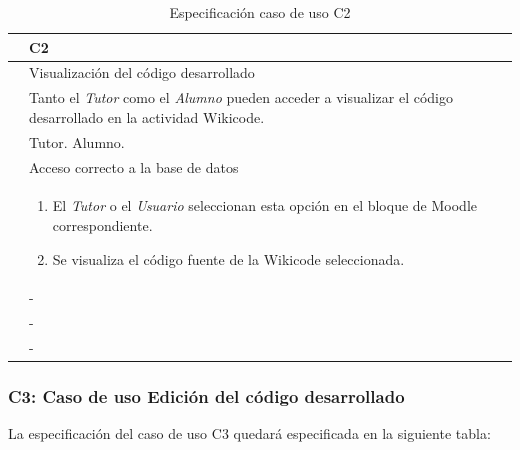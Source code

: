 \begin{table}[h]
\centering
\begin{tabular}{ | p{} | p{} | }
	\hline
	\cellcolor[gray]{.8}{ID} & C2 \\
	\hline 
	\cellcolor[gray]{.8}{Nombre} & Visualización del código desarrollado \\
	\hline
	\cellcolor[gray]{.8}{Descripción} &  Tanto el \emph{Tutor} como el \emph{Alumno} pueden acceder a visualizar el código desarrollado en la actividad Wikicode. \\
	\hline
	\cellcolor[gray]{.8}{Actores} & Tutor. Alumno. \\
	\hline
	\cellcolor[gray]{.8}{Asunciones} & Acceso correcto a la base de datos \\
	\hline
	\cellcolor[gray]{.8}{Pasos} & \begin{enumerate}
		\item El \emph{Tutor} o el \emph{Usuario} seleccionan esta opción en el bloque de Moodle correspondiente. 
		\item Se visualiza el código fuente de la Wikicode seleccionada.
		\end{enumerate} \\
	\hline
	\cellcolor[gray]{.8}{Variaciones} & - \\
	\hline
	\cellcolor[gray]{.8}{Requisitos no funcionales} & - \\
	\hline
	\cellcolor[gray]{.8}{Cuestiones} & - \\
	\hline
	
\end{tabular}
\caption{Especificación caso de uso C2}
\end{table}

\newpage
\subsubsection{C3: Caso de uso Edición del código desarrollado}

La especificación del caso de uso C3 quedará especificada en la siguiente tabla:

